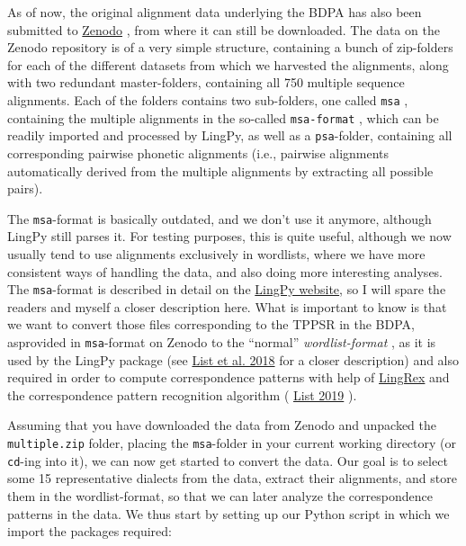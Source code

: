 \documentclass[
  a4paper,
  14pt,
  oneside,
  tablecaptionabove
]{scrbook}
\newcommand{\passthrough}[1]{#1}
\begin{document}
As of now, the original alignment data underlying the BDPA has also been
submitted to \href{https://zenodo.org/record/11880}{Zenodo} , from where
it can still be downloaded. The data on the Zenodo repository is of a
very simple structure, containing a bunch of zip-folders for each of the
different datasets from which we harvested the alignments, along with
two redundant master-folders, containing all 750 multiple sequence
alignments. Each of the folders contains two sub-folders, one called
\passthrough{\lstinline!msa!} , containing the multiple alignments in
the so-called \passthrough{\lstinline!msa-format!} , which can be
readily imported and processed by LingPy, as well as a
\passthrough{\lstinline!psa!}-folder, containing all corresponding
pairwise phonetic alignments (i.e., pairwise alignments automatically
derived from the multiple alignments by extracting all possible pairs).

The \passthrough{\lstinline!msa!}-format is basically outdated, and we
don't use it anymore, although LingPy still parses it. For testing
purposes, this is quite useful, although we now usually tend to use
alignments exclusively in wordlists, where we have more consistent ways
of handling the data, and also doing more interesting analyses. The
\passthrough{\lstinline!msa!}-format is described in detail on the
\href{http://lingpy.org/tutorial/formats.html\#multiple-alignments-msq-and-msa}{LingPy
website}, so I will spare the readers and myself a closer description
here. What is important to know is that we want to convert those files
corresponding to the TPPSR in the BDPA, asprovided in
\passthrough{\lstinline!msa!}-format on Zenodo to the \enquote{normal}
\emph{wordlist-format} , as it is used by the LingPy package (see
\href{http://bibliography.lingpy.org?key=List2018d}{List et al. 2018}
for a closer description) and also required in order to compute
correspondence patterns with help of
\href{https://github.com/lingpy/lingrex}{LingRex} and the correspondence
pattern recognition algorithm (
\href{http://bibliography.lingpy.org?key=List2019a}{List 2019} ).

Assuming that you have downloaded the data from Zenodo and unpacked the
\passthrough{\lstinline!multiple.zip!} folder, placing the
\passthrough{\lstinline!msa!}-folder in your current working directory
(or \passthrough{\lstinline!cd!}-ing into it), we can now get started to
convert the data. Our goal is to select some 15 representative dialects
from the data, extract their alignments, and store them in the
wordlist-format, so that we can later analyze the correspondence
patterns in the data. We thus start by setting up our Python script in
which we import the packages required:
\end{document}
